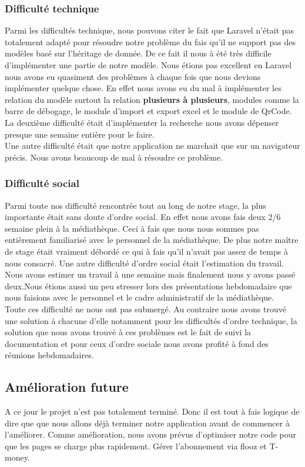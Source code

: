 \documentclass[12pt,a4paper]{article}
\begin{document}
\subsubsection{Difficulté technique}
Parmi les difficultés technique, nous pouvons citer le fait que Laravel n'était pas totalement
adapté pour résoudre notre problème du fais qu'il ne support pas des modèles basé sur l'héritage
de donnée. De ce fait il nous à été très difficile d'implémenter une partie de notre modèle.
Nous étions pas excellent en Laravel nous avons eu quasiment des problèmes à chaque
fois que nous devions implémenter quelque chose. En effet nous avons eu du mal à implémenter les 
relation du modèle surtout la relation \textbf{plusieurs à plusieurs}, modules comme la barre 
de débogage, le module d'import et export excel et le module de QrCode.\\
La deuxième difficulté était d'implémenter la recherche nous avons dépenser presque une semaine entière pour le faire.\\
Une autre difficulté était que notre application ne marchait que sur un navigateur
précis. Nous avons beaucoup de mal à résoudre ce problème. 

\subsubsection{Difficulté social} 
Parmi toute nos difficulté rencontrée tout au long de notre stage, la plus importante était sans doute d'ordre social. En effet nous avons fais deux 2/6 semaine plein à la médiathèque. Ceci à fais que nous nous sommes pas 
entièrement familiarisé avec le personnel de la médiathèque. De plus notre maître 
de stage était vraiment débordé ce qui à fais qu'il n'avait pas assez de temps à nous
consacré. Une autre difficulté d'ordre social était l'estimation du travail. Nous
avons estimer un travail à une semaine mais finalement nous y avons passé deux.Nous
étions aussi un peu stresser lors des présentations hebdomadaire que nous faisions avec le personnel et le cadre administratif de la médiathèque.\\

Toute ces difficulté ne nous ont pas submergé. Au contraire nous avons trouvé une 
solution à chacune d'elle notamment pour les difficultés d'ordre technique, la solution 
que nous avons trouvé à ces problèmes est le fait de suivi la documentation et pour ceux 
d'ordre sociale nous avons profité à fond des réunions hebdomadaires.

\subsection{Amélioration future}
A ce jour le projet n'est pas totalement terminé. Donc il est tout à fais logique de dire que
que nous allons déjà terminer notre application avant de commencer à l'améliorer.
Comme amélioration, nous avons prévus d'optimiser notre code pour que les pages se charge 
plus rapidement. Gérer l'abonnement via flooz et T-money.
\end{document}

